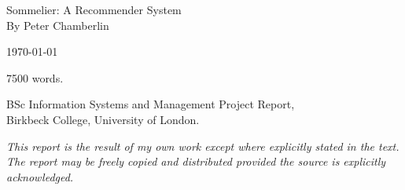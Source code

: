 \begin{titlepage}
    \begin{center}

        { \large Sommelier: A Recommender System}\\[0.4cm]

        { By Peter Chamberlin}

        { \today }

        \vfill

        { 7500 words. }

        { BSc Information Systems and Management Project Report, \\
          Birkbeck College, University of London. }

        \vspace{0.4cm}

        \textit{ This report is the result of my own work except where explicitly stated in the text. The report may be freely copied and distributed provided the source is explicitly acknowledged. }

    \end{center}
\end{titlepage}
\date{\today}


